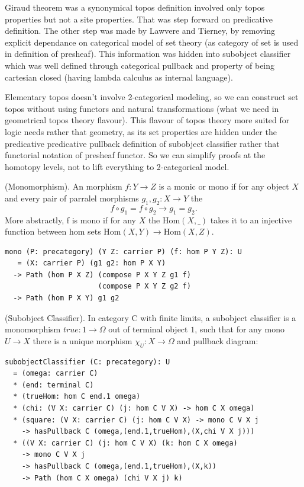 Giraud theorem was a synonymical topos definition involved only topos
properties but not a site properties. That was step forward on
predicative definition. The other step was made by Lawvere and Tierney,
by removing explicit dependance on categorical model of set
theory (as category of set is used in definition of presheaf). This information
was hidden into subobject classifier which was well defined through
categorical pullback and property of being cartesian
closed (having lambda calculus as internal language).

Elementary topos doesn't involve 2-categorical modeling, so we can construct
set topos without using functors and natural transformations
(what we need in geometrical topos theory flavour). This flavour of topos
theory more suited for logic needs rather that geometry, as its set properties
are hidden under the predicative predicative pullback definition of subobject classifier
rather that functorial notation of presheaf functor. So we can simplify proofs
at the homotopy levels, not to lift everything to 2-categorical model.

\begin{definition} (Monomorphism).
An morphism $f : Y \rightarrow Z $ is a monic or mono
if for any object $X$ and every pair of parralel morphisms $g_1,g_2: X \rightarrow Y$ the
$$
    f \circ g_1 = f \circ g_2 \rightarrow g_1 = g_2.
$$
More abstractly, f is mono if for any $X$ the $\mathrm{Hom}(X,\_)$ takes it to an injective
function between hom sets $\mathrm{Hom}(X,Y) \rightarrow \mathrm{Hom}(X,Z)$.
\begin{lstlisting}
mono (P: precategory) (Y Z: carrier P) (f: hom P Y Z): U
   = (X: carrier P) (g1 g2: hom P X Y)
  -> Path (hom P X Z) (compose P X Y Z g1 f)
                      (compose P X Y Z g2 f)
  -> Path (hom P X Y) g1 g2
\end{lstlisting}
\end{definition}

\begin{definition} (Subobject Classifier\cite{Johnstone14}).
In category $\mathrm{C}$ with finite limits,
a subobject classifier is a monomorphism $true: 1 \rightarrow \Omega$ out of terminal
object $\mathrm{1}$, such that for any mono $U \rightarrow X$ there is a unique
morphism $\chi_U : X \rightarrow \Omega$ and pullback diagram:
\begin{lstlisting}
subobjectClassifier (C: precategory): U
  = (omega: carrier C)
  * (end: terminal C)
  * (trueHom: hom C end.1 omega)
  * (chi: (V X: carrier C) (j: hom C V X) -> hom C X omega)
  * (square: (V X: carrier C) (j: hom C V X) -> mono C V X j
    -> hasPullback C (omega,(end.1,trueHom),(X,chi V X j)))
  * ((V X: carrier C) (j: hom C V X) (k: hom C X omega)
    -> mono C V X j
    -> hasPullback C (omega,(end.1,trueHom),(X,k))
    -> Path (hom C X omega) (chi V X j) k)
\end{lstlisting}
\end{definition}

